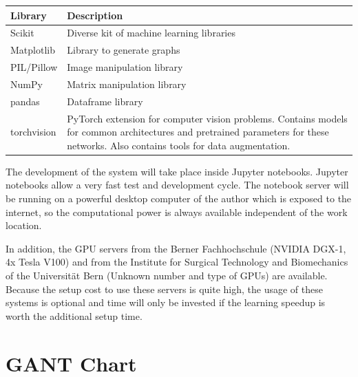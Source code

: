 \begin{tabular}{|p{3cm}|p{12.5cm}|}
    \hline
    \textbf{Library} & \textbf{Description} \\ \hline
    Scikit & Diverse kit of machine learning libraries \\ \hline
    Matplotlib & Library to generate graphs \\ \hline
    PIL/Pillow & Image manipulation library \\ \hline
    NumPy & Matrix manipulation library \\ \hline
    pandas & Dataframe library \\ \hline
    torchvision & PyTorch extension for computer vision problems. Contains models for common architectures and pretrained parameters for these networks. Also contains tools for data augmentation. \\ \hline
\end{tabular}

The development of the system will take place inside Jupyter notebooks. Jupyter notebooks allow a very fast test and development cycle. The notebook server will be running on a powerful desktop computer of the author which is exposed to the internet, so the computational power is always available independent of the work location.

In addition, the GPU servers from the Berner Fachhochschule (NVIDIA DGX-1, 4x Tesla V100) and from the Institute for Surgical Technology and Biomechanics of the Universität Bern (Unknown number and type of GPUs) are available. Because the setup cost to use these servers is quite high, the usage of these systems is optional and time will only be invested if the learning speedup is worth the additional setup time.

\section{GANT Chart}
